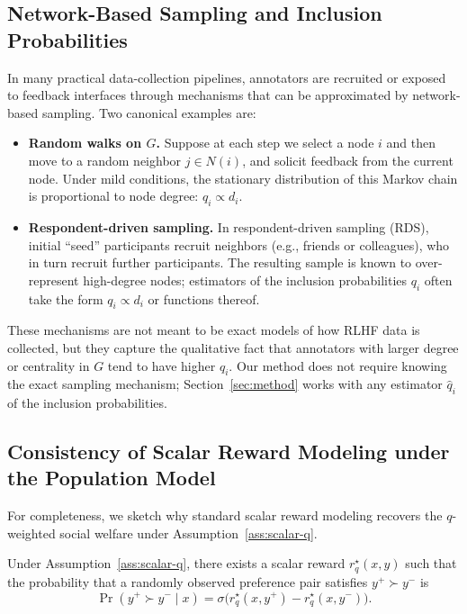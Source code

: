 \documentclass{article}
\theoremstyle{plain}
\theoremstyle{definition}
\theoremstyle{remark}
\begin{document}
\subsection{Network-Based Sampling and Inclusion Probabilities}
\label{app:network-bias}

In many practical data-collection pipelines, annotators are recruited or
exposed to feedback interfaces through mechanisms that can be approximated by
network-based sampling. Two canonical examples are:

\begin{itemize}
    \item \textbf{Random walks on $G$.} Suppose at each step we select a node
    $i$ and then move to a random neighbor $j \in N(i)$, and solicit feedback
    from the current node. Under mild conditions, the stationary distribution
    of this Markov chain is proportional to node degree:
    $q_i \propto d_i$.
    \item \textbf{Respondent-driven sampling.} In respondent-driven sampling
    (RDS), initial ``seed'' participants recruit neighbors (e.g., friends or
    colleagues), who in turn recruit further participants. The resulting
    sample is known to over-represent high-degree nodes; estimators of the
    inclusion probabilities $q_i$ often take the form $q_i \propto d_i$ or
    functions thereof.
\end{itemize}

These mechanisms are not meant to be exact models of how RLHF data is
collected, but they capture the qualitative fact that annotators with larger
degree or centrality in $G$ tend to have higher $q_i$. Our method does not
require knowing the exact sampling mechanism; Section~\ref{sec:method} works
with any estimator $\hat q_i$ of the inclusion probabilities.

\subsection{Consistency of Scalar Reward Modeling under the Population Model}
\label{app:consistency}

For completeness, we sketch why standard scalar reward modeling recovers the
$q$-weighted social welfare under Assumption~\ref{ass:scalar-q}.

Under Assumption~\ref{ass:scalar-q}, there exists a scalar reward
$r_q^\star(x,y)$ such that the probability that a randomly observed
preference pair satisfies $y^+ \succ y^-$ is
\begin{equation}
    \Pr(y^+ \succ y^- \mid x)
    =
    \sigma\!\big(r_q^\star(x,y^+) - r_q^\star(x,y^-)\big).
\end{equation}
\end{document}
